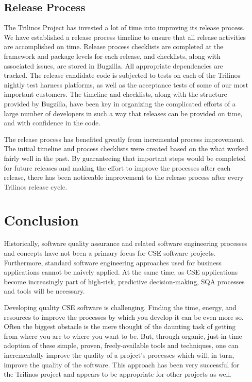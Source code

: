 \documentclass[times,10pt,twocolumn]{article}
\begin{document}
\subsection{Release Process}

The Trilinos Project has invested a lot of time into improving its
release process.  We have established a release process timeline to
ensure that all release activities are accomplished on time. Release
process checklists are completed at the framework and package levels
for each release, and checklists, along with associated issues, are
stored in Bugzilla.  All appropriate dependencies are tracked.  The
release candidate code is subjected to tests on each of the Trilinos
nightly test harness platforms, as well as the acceptance tests of
some of our most important customers.  The timeline and checklists,
along with the structure provided by Bugzilla, have been key in
organizing the complicated efforts of a large number of developers
in such a way that releases can be provided on time, and with
confidence in the code.

The release process has benefited greatly from incremental process
improvement. The initial timeline and process checklists were
created based on the what worked fairly well in the past.  By
guaranteeing that important steps would be completed for future
releases and making the effort to improve the processes after each
release, there has been noticeable improvement to the release
process after every Trilinos release cycle.



\section{Conclusion}
\label{Section:Conclusion}

Historically, software quality assurance and related software
engineering processes and concepts have not been a primary focus for
CSE software projects.  Furthermore, standard software engineering
approaches used for business applications cannot be naively applied.
At the same time, as CSE applications become increasingly part of
high-risk, predictive decision-making, SQA processes and tools will
be necessary.

Developing quality CSE software is challenging. Finding the time,
energy, and resources to improve the processes by which you develop
it can be even more so. Often the biggest obstacle is the mere
thought of the daunting task of getting from where you are to where
you want to be. But, through organic, just-in-time adoption of these
simple, proven, freely-available tools and techniques, one can
incrementally improve the quality of a project's processes which
will, in turn, improve the quality of the software.  This approach
has been very successful for the Trilinos project and appears to be
appropriate for other projects as well.
\end{document}
